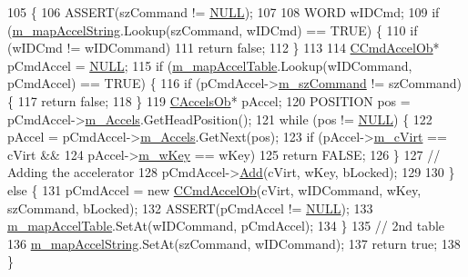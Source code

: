 \begin{DoxyCode}
105 \{
106   ASSERT(szCommand != \mbox{\hyperlink{getopt1_8c_a070d2ce7b6bb7e5c05602aa8c308d0c4}{NULL}});
107 
108   WORD wIDCmd;
109   \textcolor{keywordflow}{if} (\mbox{\hyperlink{class_c_accelerator_manager_abb40dbb1a44c47ac22590e8f1243835b}{m\_mapAccelString}}.Lookup(szCommand, wIDCmd) == TRUE) \{
110     \textcolor{keywordflow}{if} (wIDCmd != wIDCommand)
111       \textcolor{keywordflow}{return} \textcolor{keyword}{false};
112   \}
113 
114   \mbox{\hyperlink{class_c_cmd_accel_ob}{CCmdAccelOb}}* pCmdAccel = \mbox{\hyperlink{getopt1_8c_a070d2ce7b6bb7e5c05602aa8c308d0c4}{NULL}};
115   \textcolor{keywordflow}{if} (\mbox{\hyperlink{class_c_accelerator_manager_a16b8d3e9328bc0eeeb048630deff2768}{m\_mapAccelTable}}.Lookup(wIDCommand, pCmdAccel) == TRUE) \{
116     \textcolor{keywordflow}{if} (pCmdAccel->\mbox{\hyperlink{class_c_cmd_accel_ob_acbd02cc68d3909b1e39b687e76f45d91}{m\_szCommand}} != szCommand) \{
117       \textcolor{keywordflow}{return} \textcolor{keyword}{false};
118     \}
119     \mbox{\hyperlink{class_c_accels_ob}{CAccelsOb}}* pAccel;
120     POSITION pos = pCmdAccel->\mbox{\hyperlink{class_c_cmd_accel_ob_a85772f1ea9204af42b8a39a0135dc0f8}{m\_Accels}}.GetHeadPosition();
121     \textcolor{keywordflow}{while} (pos != \mbox{\hyperlink{getopt1_8c_a070d2ce7b6bb7e5c05602aa8c308d0c4}{NULL}}) \{
122       pAccel = pCmdAccel->\mbox{\hyperlink{class_c_cmd_accel_ob_a85772f1ea9204af42b8a39a0135dc0f8}{m\_Accels}}.GetNext(pos);
123       \textcolor{keywordflow}{if} (pAccel->\mbox{\hyperlink{class_c_accels_ob_a08b7003ccf92c6afcf31878960d8eee1}{m\_cVirt}} == cVirt &&
124           pAccel->\mbox{\hyperlink{class_c_accels_ob_a1891250e9a4d00c0862f3a90a965d635}{m\_wKey}} == wKey)
125         \textcolor{keywordflow}{return} FALSE;
126     \}
127     \textcolor{comment}{// Adding the accelerator}
128     pCmdAccel->\mbox{\hyperlink{class_c_cmd_accel_ob_a519f8c7ac935b0d06531589e5427b656}{Add}}(cVirt, wKey, bLocked);
129 
130   \} \textcolor{keywordflow}{else} \{
131     pCmdAccel = \textcolor{keyword}{new} \mbox{\hyperlink{class_c_cmd_accel_ob}{CCmdAccelOb}}(cVirt, wIDCommand, wKey, szCommand, bLocked);
132     ASSERT(pCmdAccel != \mbox{\hyperlink{getopt1_8c_a070d2ce7b6bb7e5c05602aa8c308d0c4}{NULL}});
133     \mbox{\hyperlink{class_c_accelerator_manager_a16b8d3e9328bc0eeeb048630deff2768}{m\_mapAccelTable}}.SetAt(wIDCommand, pCmdAccel);
134   \}
135   \textcolor{comment}{// 2nd table}
136   \mbox{\hyperlink{class_c_accelerator_manager_abb40dbb1a44c47ac22590e8f1243835b}{m\_mapAccelString}}.SetAt(szCommand, wIDCommand);
137   \textcolor{keywordflow}{return} \textcolor{keyword}{true};
138 \}
\end{DoxyCode}
